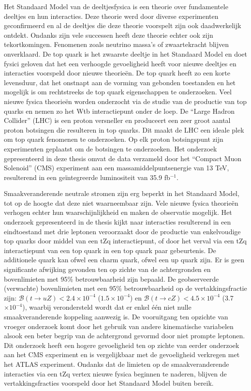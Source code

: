 \chapterprecishere{\Titledutch}
Het Standaard Model van de deeltjesfysica is een theorie over fundamentele deeltjes en hun interacties. Deze theorie werd door diverse experimenten geconfirmeerd en al de deeltjes die deze theorie voorspelt zijn ook daadwerkelijk ontdekt. Ondanks zijn vele successen heeft deze theorie echter ook zijn tekortkomingen. Fenomenen zoals neutrino massa's of zwaartekracht blijven onverklaard. De top quark is het zwaarste deeltje in het Standaard Model en doet fysici geloven dat het een verhoogde gevoeligheid heeft voor nieuwe deeltjes en interacties voorspeld door nieuwe theorie\"en. De top quark heeft zo een korte levensduur, dat het onstnapt aan de vorming van gebonden toestanden en het mogelijk is om rechtstreeks de top quark eigenschappen te onderzoeken. 
Veel nieuwe fysica theorie\"en worden onderzocht  via de studie van de productie van top quarks en nemen zo het Wtb interactiepunt onder de loep. De  ``Large Hadron Collider'' (LHC) is een proton versneller en produceert een zeer groot aantal proton botsingen die resulteren in top quarks.  Dit maakt de LHC een ideale plek om top quark fenomenen te onderzoeken. Op elk proton 
botsingspunt zijn experimenten geplaatst om de botsingen te onderzoeken.  Het onderzoek gepresenteerd in deze thesis omvat de data verzameld door het ``Compact Muon Solenoid'' (CMS) experiment aan een massamiddelpuntsenergie van  13 TeV, resulterend in een ge\"integreerde luminositeit van 35.9 fb$^{-1}$. 


Smaakveranderende neutrale stromen zijn erg beperkt in het Standaard Model, tot op de hoogte dat deze niet waarneembaar zijn. Vele nieuwe fysica theorie\"en verhogen echter hun waarschijnlijkheid en maken de observatie mogelijk. Het onderzoek gepresenteerd in de thesis kijkt naar interacties resulterend in een eindtoestand met drie leptonen veroorzaakt door de productie van enkelvoudige top quarks door middel van een tZq interactiepunt, of door het verval via een tZq interactiepunt van een top quark in een top quark paar gebeurtenis. De additionele quark kan ofwel een charm quark, ofwel een up quark zijn. Er is geen significante afwijking gevonden ten op zichte van de achtergronden en bovenlimieten met 95\% betrouwbaarheid zijn bepaald. De geobserveerde (verwachte) bovenlimieten met een 95$\%$ betrouwbaarheid op de vertakkingsfractie zijn: ${\mathcal{B}}(t \rightarrow uZ) < 2.4\times 10^{-4}$ ($1.5\times 10^{-4}$) en ${\mathcal{B}}(t \rightarrow cZ) < 4.5\times 10^{-4}$ (3.7$\times 10^{-4}$), waarbij verondersteld wordt dat er enkel \'e\'en niet nulle smaakveranderende koppeling aanwezig is. \newpage
\thispagestyle{empty}
De vooruitgang ten opzichte van vroeger onderzoek komt door het gebruik van andere kinematische variabelen alsook  een beter begrip van de achtergrond gevormd door niet prompte leptonen.  Dit onderzoek heeft een  hogere gevoeligheid ten op zichte van eerder onderzoek aan het CMS experiment en is vergelijkbaar met de gevoeligheid verkregen met het ATLAS experiment. Ondanks dat 
de limieten op de smaakveranderende interacties via een tZq vertex nieuwe fysica beginnen te naderen, blijven de vertakkingsfracties voorspeld door het Standaard Model buiten bereik. 
